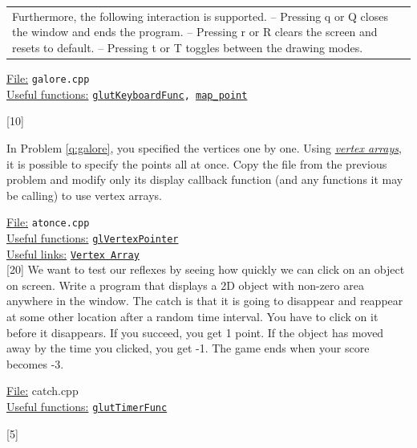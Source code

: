 \documentclass[addpoints]{exam}
\begin{document}
\begin{questions}
\begin{tabularx}{\linewidth}{lX}
    Furthermore, the following interaction is supported.\newline
    -- Pressing q or Q closes the window and ends the program.\newline
    -- Pressing r or R clears the screen and resets to default.\newline
    -- Pressing t or T toggles between the drawing modes.
  \end{tabularx}
  \underline{File:} {\tt galore.cpp}\\
  \underline{Useful functions:} {\tt \href{https://www.opengl.org/resources/libraries/glut/spec3/node49.html#SECTION00084000000000000000}{glutKeyboardFunc}, \hyperref[q:galore]{map\_point}}

  [10]

  In Problem \ref{q:galore}, you specified the vertices one by one. Using \href{http://www.informit.com/articles/article.aspx?p=1377833&seqNum=6}{\it vertex arrays}, it is possible to specify the points all at once. Copy the file from the previous problem and modify only its display callback function (and any functions it may be calling) to use vertex arrays.
  
  \noindent\underline{File:} {\tt atonce.cpp}\\
  \underline{Useful functions:} {\tt \href{https://www.khronos.org/registry/OpenGL-Refpages/gl2.1/xhtml/glVertexPointer.xml}{glVertexPointer}}\\
  \underline{Useful links:} {\tt \href{http://www.songho.ca/opengl/gl_vertexarray.html}{Vertex Array}}\\
  
  [20]
  We want to test our reflexes by seeing how quickly we can click on an object on screen. Write a program that displays a 2D object with non-zero area anywhere in the window. The catch is that it is going to disappear and reappear at some other location after a random time interval. You have to click on it before it disappears. If you succeed, you get 1 point. If the object has moved away by the time you clicked, you get -1. The game ends when your score becomes -3.

  \noindent\underline{File:} {catch.cpp}\\
  \underline{Useful functions:} {\tt \href{https://www.opengl.org/resources/libraries/glut/spec3/node64.html#SECTION000819000000000000000}{glutTimerFunc}}

  [5]
  \label{q:maxwell}
  

\end{questions}
\end{document}
